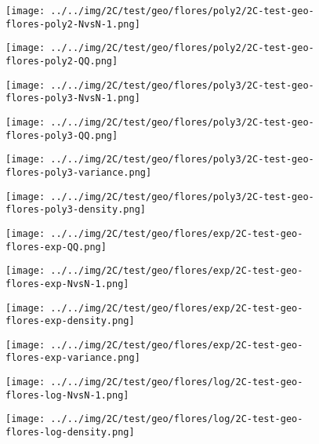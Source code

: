 \begin{figure}[H]
\centering	\texttt{[image: ../../img/2C/test/geo/flores/poly2/2C-test-geo-flores-poly2-NvsN-1.png]}
\end{figure}
\begin{figure}[H]
\centering	\texttt{[image: ../../img/2C/test/geo/flores/poly2/2C-test-geo-flores-poly2-QQ.png]}
\end{figure}
\begin{figure}[H]
\centering	\texttt{[image: ../../img/2C/test/geo/flores/poly3/2C-test-geo-flores-poly3-NvsN-1.png]}
\end{figure}
\begin{figure}[H]
\centering	\texttt{[image: ../../img/2C/test/geo/flores/poly3/2C-test-geo-flores-poly3-QQ.png]}
\end{figure}
\begin{figure}[H]
\centering	\texttt{[image: ../../img/2C/test/geo/flores/poly3/2C-test-geo-flores-poly3-variance.png]}
\end{figure}
\begin{figure}[H]
\centering	\texttt{[image: ../../img/2C/test/geo/flores/poly3/2C-test-geo-flores-poly3-density.png]}
\end{figure}
\begin{figure}[H]
\centering	\texttt{[image: ../../img/2C/test/geo/flores/exp/2C-test-geo-flores-exp-QQ.png]}
\end{figure}
\begin{figure}[H]
\centering	\texttt{[image: ../../img/2C/test/geo/flores/exp/2C-test-geo-flores-exp-NvsN-1.png]}
\end{figure}
\begin{figure}[H]
\centering	\texttt{[image: ../../img/2C/test/geo/flores/exp/2C-test-geo-flores-exp-density.png]}
\end{figure}
\begin{figure}[H]
\centering	\texttt{[image: ../../img/2C/test/geo/flores/exp/2C-test-geo-flores-exp-variance.png]}
\end{figure}
\begin{figure}[H]
\centering	\texttt{[image: ../../img/2C/test/geo/flores/log/2C-test-geo-flores-log-NvsN-1.png]}
\end{figure}
\begin{figure}[H]
\centering	\texttt{[image: ../../img/2C/test/geo/flores/log/2C-test-geo-flores-log-density.png]}
\end{figure}
